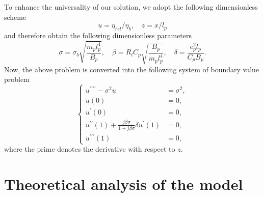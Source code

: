 \documentclass{svjour3}                     %
\begin{document}
To enhance the universality of our solution, we adopt the following dimensionless scheme
\begin{equation}
    u = \eta_{rel} / \eta_b ,\quad z = x / l_p 
\end{equation}
and therefore obtain the following dimensionless parameters
\begin{equation}
    \sigma = \sigma_b \sqrt{\frac{m_p l_p^4}{B_p}}, \quad \beta = R_l C_p \sqrt{\frac{B_p}{m_p l_p^4}}, \quad \delta = \frac{e_p^2 l_p}{C_p B_p}.
\end{equation}
Now, the above problem is converted into the following system of boundary value problem
\begin{equation}
    \left\{\begin{aligned}
        u^{\prime\prime\prime\prime} -\sigma^2 u &= \sigma^2, \\
        u(0) &= 0, \\
        u^{\prime}(0) &= 0, \\
        u^{\prime\prime}(1)  + \frac{j \beta \sigma }{1 + j \beta \sigma } \delta u^{\prime}(1) &= 0, \\
        u^{\prime\prime\prime}(1) &= 0,
    \end{aligned}\right.
    \label{eq:eq_dimensionless_system_all}
\end{equation}
where the prime denotes the derivative with respect to $z$.


\section{Theoretical analysis of the model}
\end{document}
